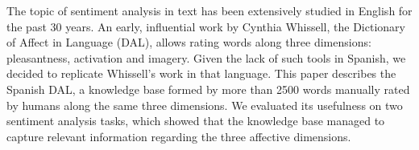 The topic of sentiment analysis in text has been extensively studied in English for the past 30 years. An early, influential work by Cynthia Whissell, the
 Dictionary of Affect in Language (DAL), allows rating words along three
 dimensions: pleasantness, activation and imagery. Given the lack of such tools
 in Spanish, we decided to replicate Whissell's work in that language. This
 paper describes the Spanish DAL, a knowledge base formed by more than 2500
 words manually rated by humans along the same three dimensions. We evaluated
 its usefulness on two sentiment analysis tasks, which showed that the knowledge
 base managed to capture relevant information regarding the three affective
 dimensions.

